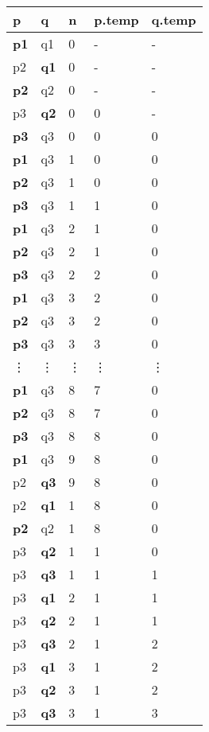\documentclass[11pt]{exam}
\begin{document}
\begin{enumerate}
    \begin{tabular}{|p{2cm}|p{2cm}|p{2cm}|p{2cm}|p{2cm}|}
      \hline
      \textbf{p} & \textbf{q} & \textbf{n} & \textbf{p.temp} & \textbf{q.temp}\\
      \hline
      \textbf{p1} & q1 & 0 & - & -\\
      p2 & \textbf{q1} & 0 & - & -\\
      \textbf{p2} & q2 & 0 & - & - \\
      p3 & \textbf{q2} & 0 & 0 & - \\
      \textbf{p3} & q3 & 0 & 0 & 0 \\
      \hline
      \textbf{p1} & q3 & 1 & 0 & 0\\
      \textbf{p2} & q3 & 1 & 0 & 0\\
      \textbf{p3} & q3 & 1 & 1 & 0 \\
      \hline
      \textbf{p1} & q3 & 2 & 1 & 0\\
      \textbf{p2} & q3 & 2 & 1 & 0\\
      \textbf{p3} & q3 & 2 & 2 & 0 \\
      \hline
      \textbf{p1} & q3 & 3 & 2 & 0\\
      \textbf{p2} & q3 & 3 & 2 & 0\\
      \textbf{p3} & q3 & 3 & 3 & 0 \\
      \vdots & \vdots & \vdots & \vdots & \vdots\\
      \textbf{p1} & q3 & 8 & 7 & 0\\
      \textbf{p2} & q3 & 8 & 7 & 0\\
      \textbf{p3} & q3 & 8 & 8 & 0\\
      \hline
      \textbf{p1} & q3 & 9 & 8 & 0\\
      p2 & \textbf{q3} & 9 & 8 & 0\\
      p2 & \textbf{q1} & 1 & 8 & 0\\
      \textbf{p2} & q2 & 1 & 8 & 0\\
      p3 & \textbf{q2} & 1 & 1 & 0\\
      p3 & \textbf{q3} & 1 & 1 & 1\\
      \hline
      p3 & \textbf{q1} & 2 & 1 & 1\\
      p3 & \textbf{q2} & 2 & 1 & 1\\
      p3 & \textbf{q3} & 2 & 1 & 2\\
      \hline
      p3 & \textbf{q1} & 3 & 1 & 2\\
      p3 & \textbf{q2} & 3 & 1 & 2\\
      p3 & \textbf{q3} & 3 & 1 & 3\\

\end{tabular}
\end{enumerate}
\end{document}
